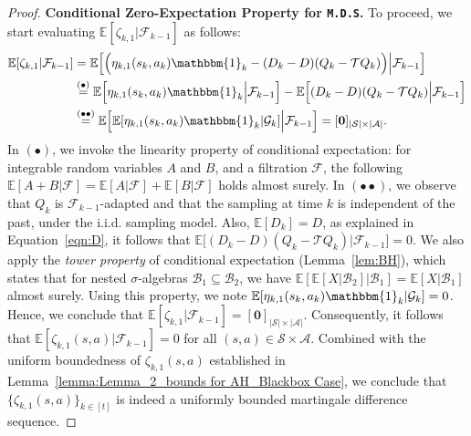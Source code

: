 \documentclass{article}
\newcommand{\mc}{\mathcal}
\begin{document}
\begin{proof}
  \textbf{Conditional Zero-Expectation Property for \texttt{M.D.S}.} To proceed, we start evaluating \(\mathbb{E}[\zeta_{k,1}\rvert \mc{F}_{k-1}]\) as follows:
\begin{equation}\label{eqn:filtration}
   \begin{aligned}
       \mathbb{E}[\zeta_{k,1}\rvert \mc{F}_{k-1}] &= \mathbb{E}\Big[\Big(\eta_{k,1}(s_k, a_k)\mathbbm{1}_k - (D_k - D)(Q_k - \mathcal{T}Q_k)\Big)\Big\lvert \mc{F}_{k-1}\Big]\\
       &\overset{(\bullet)}{=} \mathbb{E}\Big[\eta_{k,1}(s_k, a_k)\mathbbm{1}_k \Big\lvert \mc{F}_{k-1} \Big] - \mathbb{E}\Big[(D_k - D)(Q_k - \mathcal{T}Q_k) \Big\rvert \mc{F}_{k-1}\Big] \\
       &\overset{(\bullet \bullet)}{=} \mathbb{E}\Big[\mathbb{E}[\eta_{k,1}(s_k, a_k)\mathbbm{1}_k \rvert \mc{G}_k]\Big\rvert \mc{F}_{k-1}\Big]  = [\mathbf{0}]_{|\mc{S}|\times|\mc{A}|}.
   \end{aligned}
\end{equation}
In \((\bullet)\), we invoke the linearity property of conditional expectation: for integrable random variables \(A\) and \(B\), and a filtration \(\mathcal{F}\), the following \(\mathbb{E}[A + B \lvert \mathcal{F}] = \mathbb{E}[A \lvert \mathcal{F}] + \mathbb{E}[B \lvert \mathcal{F}]\) holds almost surely. In \((\bullet\bullet)\), we observe that \(Q_k\) is \(\mathcal{F}_{k-1}\)-adapted and that the sampling at time \(k\) is independent of the past, under the i.i.d. sampling model. Also, \(\mathbb{E}[D_k] = D\), as explained in Equation~\eqref{eqn:D}, it follows that  \(\mathbb{E}\big[(D_k - D)(Q_k - \mathcal{T}Q_k) \lvert \mathcal{F}_{k-1}\big] = 0\). We also apply the \emph{tower property} of conditional expectation (Lemma~\ref{lem:BH}), which states that for nested \(\sigma\)-algebras \(\mathcal{B}_1 \subseteq \mathcal{B}_2\), we have \(\mathbb{E}[\mathbb{E}[X \lvert \mathcal{B}_2] \lvert \mathcal{B}_1] = \mathbb{E}[X \lvert \mathcal{B}_1]\) almost surely. Using this property, we note \(\mathbb{E}[\eta_{k,1}(s_k, a_k)\mathbbm{1}_k \lvert \mc{G}_k] = 0\). Hence, we conclude that \(\mathbb{E}[\zeta_{k,1} \lvert \mathcal{F}_{k-1}] = [\mathbf{0}]_{|\mc{S}|\times|\mc{A}|}\). Consequently, it follows that \(\mathbb{E}[\zeta_{k,1}(s,a) \lvert\mathcal{F}_{k-1}] = 0\) for all \((s,a) \in \mathcal{S} \times \mathcal{A}\). Combined with the uniform boundedness of \(\zeta_{k,1}(s,a)\) established in Lemma~\ref{lemma:Lemma_2_bounds for AH_Blackbox Case}, we conclude that \(\{\zeta_{k,1}(s,a)\}_{k \in [t]}\) is indeed a uniformly bounded martingale difference sequence.


\end{proof}
\end{document}
